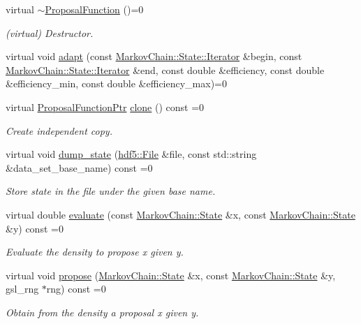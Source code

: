 \begin{DoxyCompactItemize}
\item 
virtual \hyperlink{structeos_1_1MarkovChain_1_1ProposalFunction_a758ad6e18e36b15062fe776ee7a9b3d9}{$\sim$ProposalFunction} ()=0
\begin{DoxyCompactList}\small\item\em (virtual) Destructor. \item\end{DoxyCompactList}\item 
virtual void \hyperlink{structeos_1_1MarkovChain_1_1ProposalFunction_afee6a937c53b9cfb257a5cd724a54296}{adapt} (const \hyperlink{structeos_1_1MarkovChain_1_1State_ad7590843e4feca7e696c53863e6e10c1}{MarkovChain::State::Iterator} \&begin, const \hyperlink{structeos_1_1MarkovChain_1_1State_ad7590843e4feca7e696c53863e6e10c1}{MarkovChain::State::Iterator} \&end, const double \&efficiency, const double \&efficiency\_\-min, const double \&efficiency\_\-max)=0
\item 
virtual \hyperlink{namespaceeos_ae97f9891c67c90959a03fc96efaa4dc9}{ProposalFunctionPtr} \hyperlink{structeos_1_1MarkovChain_1_1ProposalFunction_a7065079985f8bb44309d7773d85d225b}{clone} () const =0
\begin{DoxyCompactList}\small\item\em Create independent copy. \item\end{DoxyCompactList}\item 
virtual void \hyperlink{structeos_1_1MarkovChain_1_1ProposalFunction_aea88a1340e10cc6a5b03d8b5483774f7}{dump\_\-state} (\hyperlink{classeos_1_1hdf5_1_1File}{hdf5::File} \&file, const std::string \&data\_\-set\_\-base\_\-name) const =0
\begin{DoxyCompactList}\small\item\em Store state in the file under the given base name. \item\end{DoxyCompactList}\item 
virtual double \hyperlink{structeos_1_1MarkovChain_1_1ProposalFunction_ae3f2c43980ec9dfe9f35d8139f2f4ec7}{evaluate} (const \hyperlink{structeos_1_1MarkovChain_1_1State}{MarkovChain::State} \&x, const \hyperlink{structeos_1_1MarkovChain_1_1State}{MarkovChain::State} \&y) const =0
\begin{DoxyCompactList}\small\item\em Evaluate the density to propose x given y. \item\end{DoxyCompactList}\item 
virtual void \hyperlink{structeos_1_1MarkovChain_1_1ProposalFunction_a2b296008d32b1cd008e59cde1228705f}{propose} (\hyperlink{structeos_1_1MarkovChain_1_1State}{MarkovChain::State} \&x, const \hyperlink{structeos_1_1MarkovChain_1_1State}{MarkovChain::State} \&y, gsl\_\-rng $\ast$rng) const =0
\begin{DoxyCompactList}\small\item\em Obtain from the density a proposal x given y. \item\end{DoxyCompactList}\end{DoxyCompactItemize}


